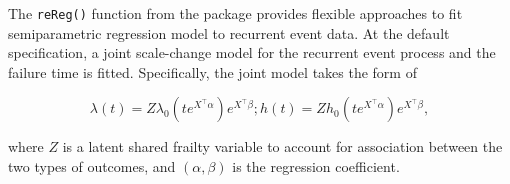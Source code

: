 The \texttt{reReg()} function from the package  provides
flexible approaches to fit semiparametric regression model to recurrent
event data. At the default specification, a joint scale-change model for
the recurrent event process and the failure time is fitted.
Specifically, the joint model takes the form of

\begin{equation}
\lambda(t) = Z \lambda_0(te^{X^\top\alpha})e^{X^\top\beta};
h(t) = Z h_0(te^{X^\top\alpha})e^{X^\top\beta},
\end{equation}

where \(Z\) is a latent shared frailty variable to account for
association between the two types of outcomes, and \((\alpha, \beta)\)
is the regression coefficient.

